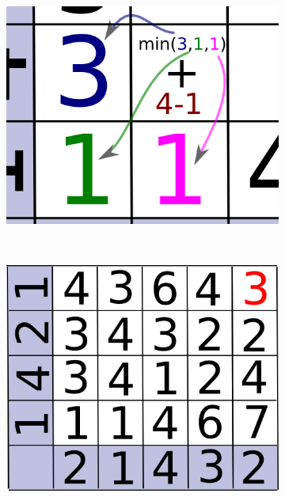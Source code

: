 \documentclass[parskip]{cs4rep}
\begin{document}
\begin{figure}
   ~
   \begin{subfigure}[b]{0.3\textwidth}
       \includegraphics[width=\textwidth]{figures/DTW/worked-out/step-3.png}
       \caption{}
       \label{fig:DTW:example:3}
   \end{subfigure}
   ~
   \begin{subfigure}[b]{0.3\textwidth}
       \includegraphics[width=\textwidth]{figures/DTW/worked-out/step-4.png}
       \caption{}
       \label{fig:DTW:example:4}
   \end{subfigure}
   ~
   \begin{subfigure}[b]{0.3\textwidth}

\end{subfigure}
\end{figure}
\end{document}
